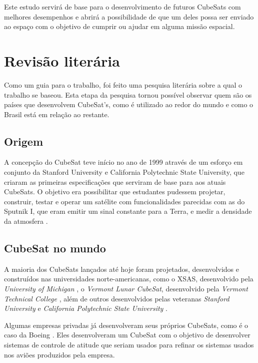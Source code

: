 \documentclass[
	12pt,				%
	openany,			%
	twoside,			%
	a4paper,			%
	english,			%
	french,				%
	spanish,			%
	brazil,				%
	oldfontcommands
	]{abntex2}
\begin{document}
Este estudo servirá de base para o desenvolvimento de futuros CubeSats com melhores desempenhos e abrirá a possibilidade de que um deles possa ser enviado ao espaço com o objetivo de cumprir ou ajudar em alguma missão espacial.


\chapter[Revisão literária]{Revisão literária}

Como um guia para o trabalho, foi feito uma pesquisa literária sobre a qual o trabalho se baseou. Esta etapa da pesquisa tornou possível observar quem são os países que desenvolvem CubeSat's, como é utilizado ao redor do mundo e como o Brasil está em relação ao restante.

\section[Origem]{Origem}

A concepção do CubeSat teve início no ano de 1999 através de um esforço em conjunto da Stanford University e California Polytechnic State University, que criaram as primeiras especificações que serviram de base para aos atuais CubeSats. O objetivo era possibilitar que estudantes pudessem projetar, construir, testar e operar um satélite com funcionalidades parecidas com as do Sputnik I, que eram emitir um sinal constante para a Terra, e medir a densidade da atmosfera \cite{SmallSat}.

\section[CubeSat no mundo]{CubeSat no mundo} 

A maioria dos CubeSats lançados até hoje foram projetados, desenvolvidos e construídos nas universidades norte-americanas, como o XSAS, desenvolvido pela \textit{University of Michigan} \cite{MCKAY}, o \textit{Vermont Lunar CubeSat}, desenvolvido pela \textit{Vermont Technical College} \cite{Vermont}, além de outros desenvolvidos pelas veteranas \textit{Stanford University} \cite{TWIGGS} e \textit{California Polytechnic State University} \cite{PolySat}.

Algumas empresas privadas já desenvolveram seus próprios CubeSats, como é o caso da Boeing \cite{Boeing}. Eles desenvolveram um CubeSat com o objetivo de desenvolver sistemas de controle de atitude que seriam usados para refinar os sistemas usados nos aviões produzidos pela empresa.
\end{document}
